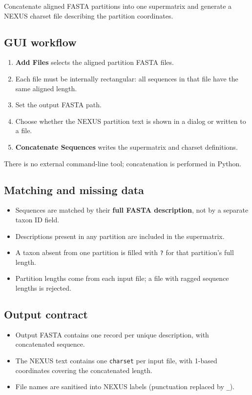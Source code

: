 \documentclass[11pt]{report}
\begin{document}
Concatenate aligned FASTA partitions into one supermatrix and generate a NEXUS charset file describing the partition coordinates.

\subsection{GUI workflow}

\begin{enumerate}
  \item \textbf{Add Files} selects the aligned partition FASTA files.
  \item Each file must be internally rectangular: all sequences in that file have the same aligned length.
  \item Set the output FASTA path.
  \item Choose whether the NEXUS partition text is shown in a dialog or written to a file.
  \item \textbf{Concatenate Sequences} writes the supermatrix and charset definitions.
\end{enumerate}

There is no external command-line tool; concatenation is performed in Python.

\subsection{Matching and missing data}

\begin{itemize}
  \item Sequences are matched by their \textbf{full FASTA description}, not by a separate taxon ID field.
  \item Descriptions present in any partition are included in the supermatrix.
  \item A taxon absent from one partition is filled with \texttt{?} for that partition's full length.
  \item Partition lengths come from each input file; a file with ragged sequence lengths is rejected.
\end{itemize}

\subsection{Output contract}

\begin{itemize}
  \item Output FASTA contains one record per unique description, with concatenated sequence.
  \item The NEXUS text contains one \texttt{charset} per input file, with 1-based coordinates covering the concatenated length.
  \item File names are sanitised into NEXUS labels (punctuation replaced by \texttt{\_\allowbreak }).
\end{itemize}
\end{document}
